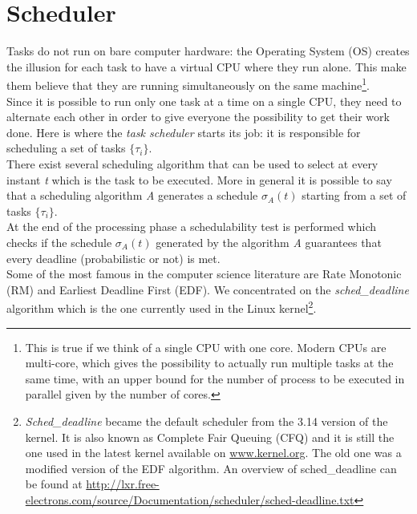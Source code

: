 \section{Scheduler}
Tasks do not run on bare computer hardware: the Operating System (OS) creates the illusion for each task to have a virtual CPU where they run alone. This make them believe that they are running simultaneously on the same machine\footnote{This is true if we think of a single CPU with one core. Modern CPUs are multi-core, which gives the possibility to actually run multiple tasks at the same time, with an upper bound for the number of process to be executed in parallel given by the number of cores.}.\\
Since it is possible to run only one task at a time on a single CPU, they need to alternate each other in order to give everyone the possibility to get their work done. Here is where the \emph{task scheduler} starts its job: it is responsible for scheduling a set of tasks \( \{\tau_{i}\} \).\\
There exist several scheduling algorithm that can be used to select at every instant \emph{t} which is the task to be executed. More in general it is possible to say that a scheduling algorithm \emph{A} generates a schedule \( \sigma_{A}\left(t\right) \) starting from a set of tasks \( \{\tau_{i}\} \).\\
At the end of the processing phase a schedulability test is performed which checks if the schedule \( \sigma_{A}\left(t\right) \) generated by the algorithm \emph{A} guarantees that every deadline (probabilistic or not) is met.\\
Some of the most famous in the computer science literature are Rate Monotonic (RM) and Earliest Deadline First (EDF). We concentrated on the \emph{sched\_deadline} algorithm which is the one currently used in the Linux kernel\footnote{\emph{Sched\_deadline} became the default scheduler from the 3.14 version of the kernel. It is also known as Complete Fair Queuing (CFQ) and it is still the one used in the latest kernel available on \url{www.kernel.org}. The old one was a modified version of the EDF algorithm. An overview of sched\_deadline can be found at \url{http://lxr.free-electrons.com/source/Documentation/scheduler/sched-deadline.txt}}.

